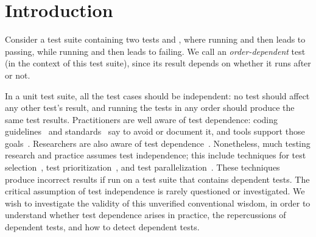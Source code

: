\section{Introduction}


Consider a test suite containing two tests 
and , where running  and then  leads
to  passing, while running  and then
 leads to  failing. We call 
an \textit{order-dependent} test (in the context of this test suite), since its result depends on
whether it runs after  or not.



In a unit test suite, all the test cases should be independent:
no test should affect any other test's result, and
running the tests in any order should produce the same test results.
Practitioners are well aware of test dependence:  coding
guidelines~\cite{unit-test-def,Massol:2003} and
standards~\cite{IEEE:829-1998,IEEE:829-2008} say to avoid or document it,
and tools support those goals~\cite{junitordering,depunit,testng, easymock, randomjunit}.
Researchers are also aware of test
dependence~\cite{Csallner:2004, Steimann:2013, Gray:1994:QGB:191843.191886,Chays:2000:FTD:347324.348954,kapfhammeretal:FSE:2003,Wang:2007:AGC, Samimi:2013:DM}.
Nonetheless, much testing research and practice
assumes test independence;
this include techniques for test selection~\cite{harroldetal:OOPSLA:2001,RenCR2006},
test prioritization~\cite{Elbaum:2000:PTC:347324.348910},
and test parallelization~\cite{Misailovic:2007}.
These techniques produce incorrect results if run on a test suite that contains dependent tests.
The critical assumption of test independence is rarely questioned or investigated.
We wish to investigate the validity of this unverified conventional wisdom,
in order to understand whether test dependence arises in practice, 
the repercussions of dependent tests, and how to 
detect dependent tests.

